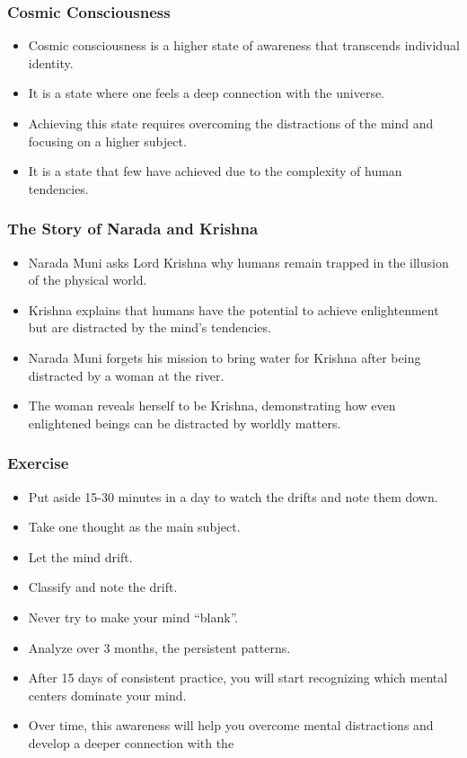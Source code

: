 \begin{frame}[fragile]\frametitle{Cosmic Consciousness}
  \begin{itemize}
    \item Cosmic consciousness is a higher state of awareness that transcends individual identity.
    \item It is a state where one feels a deep connection with the universe.
    \item Achieving this state requires overcoming the distractions of the mind and focusing on a higher subject.
    \item It is a state that few have achieved due to the complexity of human tendencies.
  \end{itemize}
\end{frame}

\begin{frame}[fragile]\frametitle{The Story of Narada and Krishna}
  \begin{itemize}
    \item Narada Muni asks Lord Krishna why humans remain trapped in the illusion of the physical world.
    \item Krishna explains that humans have the potential to achieve enlightenment but are distracted by the mind’s tendencies.
    \item Narada Muni forgets his mission to bring water for Krishna after being distracted by a woman at the river.
    \item The woman reveals herself to be Krishna, demonstrating how even enlightened beings can be distracted by worldly matters.
  \end{itemize}
\end{frame}



\begin{frame}[fragile]\frametitle{Exercise}
\begin{itemize}
\item Put aside 15-30 minutes in a day to watch the drifts and note them down.
\item Take one thought as the main subject.
\item Let the mind drift.
\item Classify and note the drift.
\item Never try to make your mind ``blank''.
\item Analyze over 3 months, the persistent patterns.
\item After 15 days of consistent practice, you will start recognizing which mental centers dominate your mind.
\item Over time, this awareness will help you overcome mental distractions and develop a deeper connection with the 
\end{itemize}
\end{frame}





